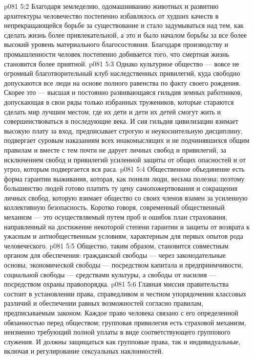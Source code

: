 \vs p081 5:2 Благодаря земледелию, одомашниванию животных и развитию архитектуры человечество постепенно избавлялось от худших качеств в непрекращающейся борьбе за существование и стало задумываться над тем, как сделать жизнь более привлекательной, а это и было началом борьбы за все более высокий уровень материального благосостояния. Благодаря производству и промышленности человек постепенно добивается того, что смертная жизнь становится более приятной.
\vs p081 5:3 Однако культурное общество --- вовсе не огромный благотворительный клуб наследственных привилегий, куда свободно допускаются все люди на основе полного равенства по факту своего рождения. Скорее это --- высшая и постоянно развивающаяся гильдия земных работников, допускающая в свои ряды только избранных тружеников, которые стараются сделать мир лучшим местом, где их дети и дети их детей смогут жить и совершенствоваться в последующие века. И сия гильдия цивилизации взимает высокую плату за вход, предписывает строгую и неукоснительную дисциплину, подвергает суровым наказаниям всех инакомыслящих и не подчинявшихся общим правилам и вместе с тем почти не дарует личных свобод и привилегий, за исключением свобод и привилегий усиленной защиты от общих опасностей и от угроз, которым подвергается вся раса.
\vs p081 5:4 Общественное объединение есть форма гарантии выживания, которая, как поняли люди, весьма полезна; поэтому большинство людей готово платить ту цену самопожертвования и сокращения личных свобод, которую взимает общество со своих членов взамен за усиленную коллективную безопасность. Коротко говоря, современный общественный механизм --- это осуществляемый путем проб и ошибок план страхования, направленный на достижение некоторой степени гарантии и защиты от возврата к ужасным и антиобщественным условиям, характерным для первых опытов рода человеческого.
\vs p081 5:5 Общество, таким образом, становится совместным органом для обеспечения: гражданской свободы --- через законодательные основы, экономической свободы --- посредством капитала и предприимчивости, социальной свободы --- средствами культуры, а свободы от насилия --- посредством охраны правопорядка.
\vs p081 5:6  Главная миссия правительства состоит в установлении права, справедливом и честном упорядочении классовых различий и обеспечении равных возможностей согласно правилам, предписываемым законом. Каждое право человека связано с его определенной обязанностью перед обществом; групповая привилегия есть страховой механизм, неизменно требующий полной уплаты в виде соответствующего группового служения. И должны защищаться как групповые права, так и индивидуальные, включая и регулирование сексуальных наклонностей.
